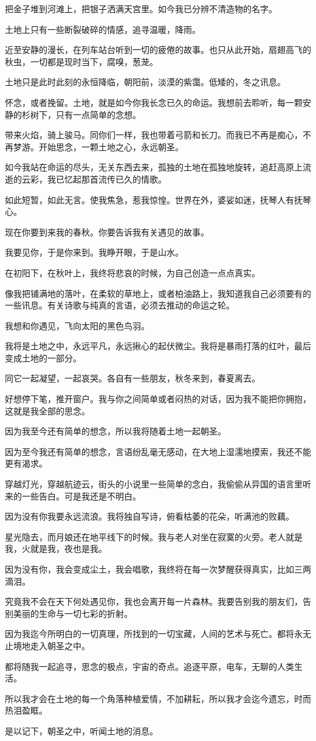 \documentclass[UTF8]{article}
\begin{document}
\par 把金子堆到河滩上，把银子洒满天宫里。如今我已分辨不清造物的名字。
\par 土地上只有一些断裂破碎的情感，追寻温暖，降雨。
\par 近至安静的漫长，在列车站台听到一切的疲倦的故事。也只从此开始，扇翅高飞的秋虫，一切都是现时当下，腐嗅，葱茏。
\par 土地只是此时此刻的永恒降临，朝阳前，淡漠的紫霭。低矮的，冬之讯息。
\par 怀念，或者挽留。土地，就是如今你我长念已久的命运。我想前去聆听，每一颗安静的杉树下，只有一点简单的念想。
\par 带来火焰，骑上骏马。同你们一样，我也带着弓箭和长刀。而我已不再是痴心，不再梦游。开始思念，一颗土地之心，永远朝圣。
\par 如今我站在命运的尽头，无关东西去来，孤独的土地在孤独地旋转，追赶高原上流逝的云彩，我已忆起那首流传已久的情歌。
\par 如此短暂，如此无言。使我焦急，惹我惊惶。世界在外，婆娑如迷，抚琴人有抚琴心。
\par 现在你要到来我的春秋。你要告诉我有关遇见的故事。
\par 我要见你，于是你来到。我睁开眼，于是山水。
\\[0.6cm]
\par 在初阳下，在秋叶上，我终将悲哀的时候，为自己创造一点点真实。
\par 像我把铺满地的落叶，在柔软的草地上，或者柏油路上，我知道我自己必须要有的一些讯息。有关诗歌与纯真的言语，必须去推动的命运之轮。
\par 我想和你遇见，飞向太阳的黑色鸟羽。
\par 我将是土地之中，永远平凡，永远揪心的起伏微尘。我将是暴雨打落的红叶，最后变成土地的一部分。
\par 同它一起凝望，一起哀哭。各自有一些朋友，秋冬来到，春夏离去。
\par 好想停下笔，推开窗户。我与你之间简单或者闷热的对话，因为我不能把你拥抱，这就是我全部的思念。
\par 因为我至今还有简单的想念，所以我将随着土地一起朝圣。
\par 因为至今我还有简单的想念，言语纷乱毫无感动，在大地上湿濡地摸索，我还不能更有渴求。
\par 穿越灯光，穿越航迹云，街头的小说里一些简单的念白，我偷偷从异国的语言里听来的一些告白。可是我还是不明白。
\par 因为没有你我要永远流浪。我将独自写诗，俯看枯萎的花朵，听满池的败藕。
\par 星光隐去，而月娘还在地平线下的时候。我与老人对坐在寂寞的火旁。老人就是我，火就是我，夜也是我。
\par 因为没有你，我会变成尘土，我会唱歌，我终将在每一次梦醒获得真实，比如三两滴泪。
\par 究竟我不会在天下何处遇见你，我也会离开每一片森林。我要告别我的朋友们，告别美丽的生命与一切七彩的折射。
\par 因为我迄今所明白的一切真理，所找到的一切宝藏，人间的艺术与死亡。都将永无止境地走入朝圣之中。
\par 都将随我一起追寻，思念的极点，宇宙的奇点。追逐平原，电车，无聊的人类生活。
\par 所以我才会在土地的每一个角落种植爱情，不加耕耘，所以我才会迄今遗忘，时而热泪盈眶。
\par 是以记下，朝圣之中，听闻土地的消息。
\end{document}
